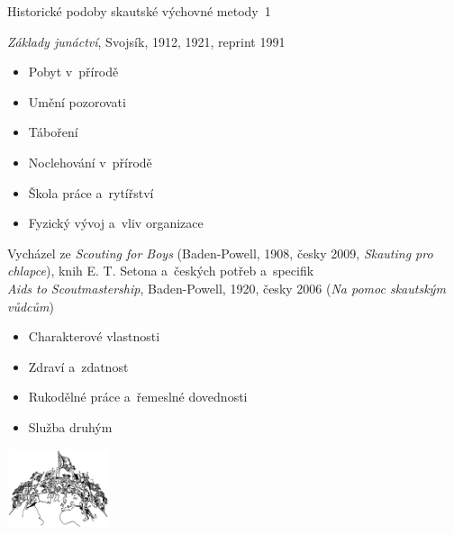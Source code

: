 \documentclass[compress,xelatex,xcolor=dvipsnames,print]{beamer}
\begin{document}
\begin{frame}{Historické podoby skautské výchovné metody~1}
\begin{multicols}{2}
\textit{Základy junáctví}, Svojsík, 1912, 1921, reprint 1991
\begin{itemize}
 \item Pobyt v~přírodě
 \item Umění pozorovati
 \item Táboření
 \item Noclehování v~přírodě
 \item Škola práce a~rytířství
 \item Fyzický vývoj a~vliv organizace
\end{itemize}
Vycházel ze \textit{Scouting for Boys} (Baden-Powell, 1908, česky 2009, \textit{Skauting pro chlapce}), knih E. T. Setona a~českých potřeb a~specifik\\
\columnbreak
\textit{Aids to Scoutmastership}, Baden-Powell, 1920, česky 2006 (\textit{Na pomoc skautským vůdcům})
\begin{itemize}
 \item Charakterové vlastnosti
 \item Zdraví a~zdatnost
 \item Rukodělné práce a~řemeslné dovednosti
 \item Služba druhým
\end{itemize}
\begin{center}
 \includegraphics[width=3cm]{sireni.png}
\end{center}
\end{multicols}
\end{frame}
\end{document}
